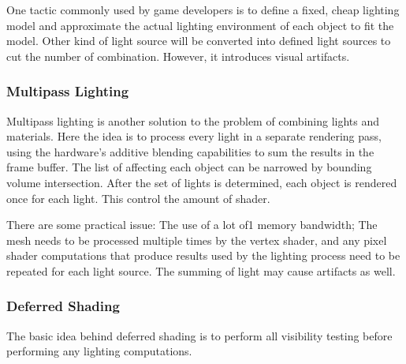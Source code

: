 \documentclass[10pt, a4paper]{article}
\begin{document}
        One tactic commonly used by game developers is to define a fixed, cheap lighting model and approximate the actual lighting environment of each object to fit the model. Other kind of light source will be converted into defined light sources to cut the number of combination. However, it introduces visual artifacts. 

        \subsubsection{Multipass Lighting}
            Multipass lighting is another solution to the problem of combining lights and materials. Here the idea is to process every light in a separate rendering pass, using the hardware's additive blending capabilities to sum the results in the frame buffer. The list of affecting each object can be narrowed by bounding volume intersection. After the set of lights is determined, each object is rendered once for each light. This control the amount of shader. 

            There are some practical issue: The use of a lot of1 memory bandwidth; The mesh needs to be processed multiple times by the vertex shader, and any pixel shader computations that produce results used by the lighting process need to be repeated for each light source. The summing of light may cause artifacts as well. 
        
        \subsubsection{Deferred Shading}
            The basic idea behind deferred shading is to perform all visibility testing before performing any lighting computations.   

        
\end{document}
